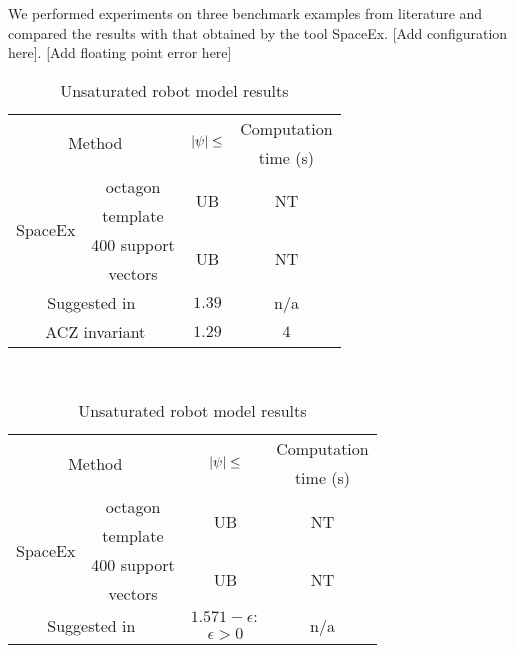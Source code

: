 We performed experiments on three benchmark examples from literature
and compared the results with that obtained by the tool SpaceEx. [Add
  configuration here]. [Add floating point error here]
\begin{table}
\begin{minipage}{0.48\textwidth}
\centering
\begin{tabular}{|l|c|c|c|}
\hline
\multicolumn{2}{|c|}{\multirow{2}{*}{Method}} &
\multirow{2}{*}{$\left|\psi\right|\leq$} & Computation\\
\multicolumn{2}{|c|}{} & & time (s)\\
\hline
\multirow{4}{*}{SpaceEx} & octagon & \multirow{2}{*}{UB} & \multirow{2}{*}{NT}\\
& template & & \\
\cline{2-4}
& 400 support & \multirow{2}{*}{UB} & \multirow{2}{*}{NT}\\
& vectors & &\\
\hline
\multicolumn{2}{|c|}{\multirow{2}{*}{Suggested in~\cite{TODO}}} &
\multirow{2}{*}{$1.39$} & \multirow{2}{*}{n/a}\\
\multicolumn{2}{|c|}{} & &\\
\hline
\multicolumn{2}{|c|}{\multirow{2}{*}{ACZ invariant}} & \multirow{2}{*}{$1.29$} &
\multirow{2}{*}{$4$}\\
\multicolumn{2}{|c|}{} & & \\
\hline
\end{tabular}
\caption{Unsaturated robot model results}
~\label{tab:robot-unsaturated}
\end{minipage}
\hspace{0em}
\begin{minipage}{0.48\textwidth}
\centering
\begin{tabular}{|l|c|c|c|}
\hline
\multicolumn{2}{|c|}{\multirow{2}{*}{Method}} &
\multirow{2}{*}{$\left|\psi\right|\leq$} & Computation\\
\multicolumn{2}{|c|}{} & & time (s)\\
\hline
\multirow{4}{*}{SpaceEx} & octagon & \multirow{2}{*}{UB} &
\multirow{2}{*}{NT}\\
& template & & \\
\cline{2-4}
& 400 support & \multirow{2}{*}{UB} & \multirow{2}{*}{NT}\\
& vectors & & \\
\hline
\multicolumn{2}{|c|}{\multirow{2}{*}{Suggested in~\cite{TODO}}} &
$1.571-\epsilon:$ & \multirow{2}{*}{n/a}\\
\multicolumn{2}{|c|}{} & $\epsilon>0$ &\\

\end{tabular}
\end{minipage}
\end{table}
